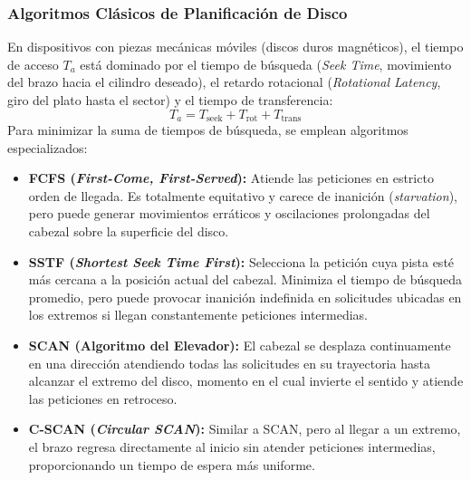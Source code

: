 \documentclass[11pt,letterpaper]{article}
\begin{document}
\subsubsection{Algoritmos Clásicos de Planificación de Disco}
En dispositivos con piezas mecánicas móviles (discos duros magnéticos), el tiempo de acceso $T_a$ está dominado por el tiempo de búsqueda (\textit{Seek Time}, movimiento del brazo hacia el cilindro deseado), el retardo rotacional (\textit{Rotational Latency}, giro del plato hasta el sector) y el tiempo de transferencia:
\begin{equation}
    T_a = T_{\text{seek}} + T_{\text{rot}} + T_{\text{trans}}
\end{equation}
Para minimizar la suma de tiempos de búsqueda, se emplean algoritmos especializados:
\begin{itemize}
    \item \textbf{FCFS (\textit{First-Come, First-Served}):} Atiende las peticiones en estricto orden de llegada. Es totalmente equitativo y carece de inanición (\textit{starvation}), pero puede generar movimientos erráticos y oscilaciones prolongadas del cabezal sobre la superficie del disco.
    \item \textbf{SSTF (\textit{Shortest Seek Time First}):} Selecciona la petición cuya pista esté más cercana a la posición actual del cabezal. Minimiza el tiempo de búsqueda promedio, pero puede provocar inanición indefinida en solicitudes ubicadas en los extremos si llegan constantemente peticiones intermedias.
    \item \textbf{SCAN (Algoritmo del Elevador):} El cabezal se desplaza continuamente en una dirección atendiendo todas las solicitudes en su trayectoria hasta alcanzar el extremo del disco, momento en el cual invierte el sentido y atiende las peticiones en retroceso.
    \item \textbf{C-SCAN (\textit{Circular SCAN}):} Similar a SCAN, pero al llegar a un extremo, el brazo regresa directamente al inicio sin atender peticiones intermedias, proporcionando un tiempo de espera más uniforme.
\end{itemize}
\end{document}

